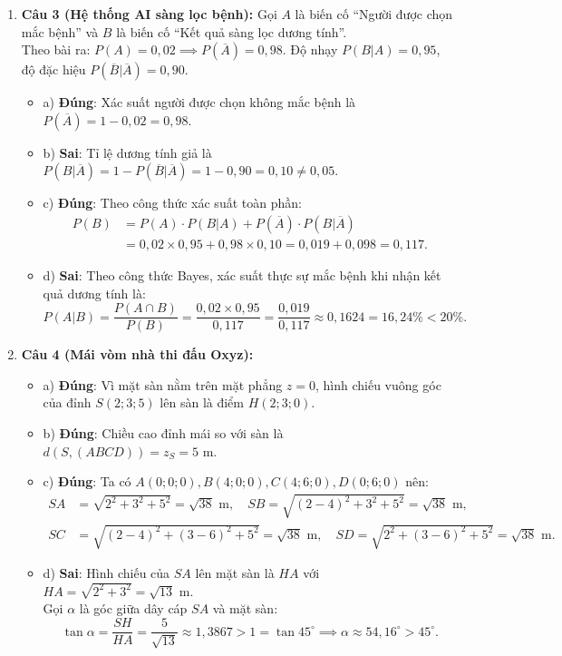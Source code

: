 \documentclass[12pt,a4paper]{article}
\begin{document}
\begin{enumerate}[label=\textbf{Câu \arabic*:}, leftmargin=*]
\item \textbf{Câu 3 (Hệ thống AI sàng lọc bệnh):}
Gọi $A$ là biến cố ``Người được chọn mắc bệnh'' và $B$ là biến cố ``Kết quả sàng lọc dương tính''.\\
Theo bài ra: $P(A) = 0{,}02 \implies P(\overline{A}) = 0{,}98$. Độ nhạy $P(B|A) = 0{,}95$, độ đặc hiệu $P(\overline{B}|\overline{A}) = 0{,}90$.
\begin{itemize}
    \item a) \textbf{Đúng}: Xác suất người được chọn không mắc bệnh là $P(\overline{A}) = 1 - 0{,}02 = 0{,}98$.
    \item b) \textbf{Sai}: Tỉ lệ dương tính giả là $P(B|\overline{A}) = 1 - P(\overline{B}|\overline{A}) = 1 - 0{,}90 = 0{,}10 \ne 0{,}05$.
    \item c) \textbf{Đúng}: Theo công thức xác suất toàn phần:
    \begin{align*}
    P(B) &= P(A) \cdot P(B|A) + P(\overline{A}) \cdot P(B|\overline{A}) \\
    &= 0{,}02 \times 0{,}95 + 0{,}98 \times 0{,}10 = 0{,}019 + 0{,}098 = 0{,}117.
    \end{align*}
    \item d) \textbf{Sai}: Theo công thức Bayes, xác suất thực sự mắc bệnh khi nhận kết quả dương tính là:
    $$P(A|B) = \dfrac{P(A \cap B)}{P(B)} = \dfrac{0{,}02 \times 0{,}95}{0{,}117} = \dfrac{0{,}019}{0{,}117} \approx 0{,}1624 = 16{,}24\% < 20\%.$$
\end{itemize}

\item \textbf{Câu 4 (Mái vòm nhà thi đấu Oxyz):}
\begin{itemize}
    \item a) \textbf{Đúng}: Vì mặt sàn nằm trên mặt phẳng $z = 0$, hình chiếu vuông góc của đỉnh $S(2; 3; 5)$ lên sàn là điểm $H(2; 3; 0)$.
    \item b) \textbf{Đúng}: Chiều cao đỉnh mái so với sàn là $d(S, (ABCD)) = z_S = 5\text{ m}$.
    \item c) \textbf{Đúng}: Ta có $A(0; 0; 0), B(4; 0; 0), C(4; 6; 0), D(0; 6; 0)$ nên:
    \begin{align*}
    SA &= \sqrt{2^2 + 3^2 + 5^2} = \sqrt{38}\text{ m},\quad SB = \sqrt{(2-4)^2 + 3^2 + 5^2} = \sqrt{38}\text{ m}, \\
    SC &= \sqrt{(2-4)^2 + (3-6)^2 + 5^2} = \sqrt{38}\text{ m},\quad SD = \sqrt{2^2 + (3-6)^2 + 5^2} = \sqrt{38}\text{ m}.
    \end{align*}
    \item d) \textbf{Sai}: Hình chiếu của $SA$ lên mặt sàn là $HA$ với $HA = \sqrt{2^2 + 3^2} = \sqrt{13}\text{ m}$.\\
    Gọi $\alpha$ là góc giữa dây cáp $SA$ và mặt sàn:
    $$\tan\alpha = \dfrac{SH}{HA} = \dfrac{5}{\sqrt{13}} \approx 1{,}3867 > 1 = \tan 45^\circ \implies \alpha \approx 54{,}16^\circ > 45^\circ.$$
\end{itemize}

\end{enumerate}
\end{document}
